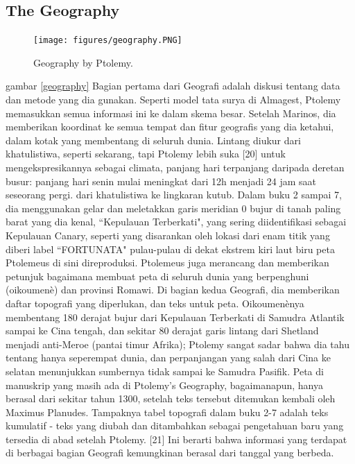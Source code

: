 \subsection{The Geography}	
   \begin{figure} [ht]
	\centerline{\texttt{[image: figures/geography.PNG]}}
	\caption{Geography by Ptolemy.}
		\end{figure}
    gambar \ref{geography} Bagian pertama dari Geografi adalah diskusi tentang data dan metode yang dia gunakan. Seperti model tata surya di Almagest, Ptolemy memasukkan semua informasi ini ke dalam skema besar. Setelah Marinos, dia memberikan koordinat ke semua tempat dan fitur geografis yang dia ketahui, dalam kotak yang membentang di seluruh dunia. Lintang diukur dari khatulistiwa, seperti sekarang, tapi Ptolemy lebih suka [20] untuk mengekspresikannya sebagai climata, panjang hari terpanjang daripada deretan busur: panjang hari senin mulai meningkat dari 12h menjadi 24 jam saat seseorang pergi. dari khatulistiwa ke lingkaran kutub. Dalam buku 2 sampai 7, dia menggunakan gelar dan meletakkan garis meridian 0 bujur di tanah paling barat yang dia kenal, ``Kepulauan Terberkati", yang sering diidentifikasi sebagai Kepulauan Canary, seperti yang disarankan oleh lokasi dari enam titik yang diberi label ``FORTUNATA" pulau-pulau di dekat ekstrem kiri laut biru peta Ptolemeus di sini direproduksi.
	Ptolemeus juga merancang dan memberikan petunjuk bagaimana membuat peta di seluruh dunia yang berpenghuni (oikoumenè) dan provinsi Romawi. Di bagian kedua Geografi, dia memberikan daftar topografi yang diperlukan, dan teks untuk peta. Oikoumenènya membentang 180 derajat bujur dari Kepulauan Terberkati di Samudra Atlantik sampai ke Cina tengah, dan sekitar 80 derajat garis lintang dari Shetland menjadi anti-Meroe (pantai timur Afrika); Ptolemy sangat sadar bahwa dia tahu tentang hanya seperempat dunia, dan perpanjangan yang salah dari Cina ke selatan menunjukkan sumbernya tidak sampai ke Samudra Pasifik.
	Peta di manuskrip yang masih ada di Ptolemy's Geography, bagaimanapun, hanya berasal dari sekitar tahun 1300, setelah teks tersebut ditemukan kembali oleh Maximus Planudes. Tampaknya tabel topografi dalam buku 2-7 adalah teks kumulatif - teks yang diubah dan ditambahkan sebagai pengetahuan baru yang tersedia di abad setelah Ptolemy. [21] Ini berarti bahwa informasi yang terdapat di berbagai bagian Geografi kemungkinan berasal dari tanggal yang berbeda. 
